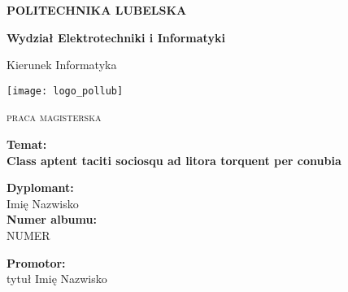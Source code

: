 \begin{titlepage}
\begin{center}

{\Huge\scshape \textbf{POLITECHNIKA LUBELSKA}}
\vspace{0.8cm}

{\LARGE \textbf{Wydział Elektrotechniki i Informatyki}}
\vspace{0.8cm}

{\LARGE Kierunek Informatyka}
\vspace{1cm}


\texttt{[image: logo\_pollub]}
\vspace{2cm}

{\LARGE\scshape praca magisterska}
\vfill

\textbf{Temat:}\\
\large\textbf{Class aptent taciti sociosqu ad litora torquent per conubia}
\end{center}
\vspace{2cm}

\begin{minipage}{0.6\textwidth}
    \textbf{Dyplomant:}\\
    Imię Nazwisko\\
    \textbf{Numer albumu:}\\
    NUMER
\end{minipage}
\begin{minipage}{0.3\textwidth}
    \textbf{Promotor:} \\
    tytuł Imię Nazwisko
\end{minipage}
 
\center{ \textbf{\today}}

\end{titlepage}
\clearpage
\tableofcontents
\clearpage
